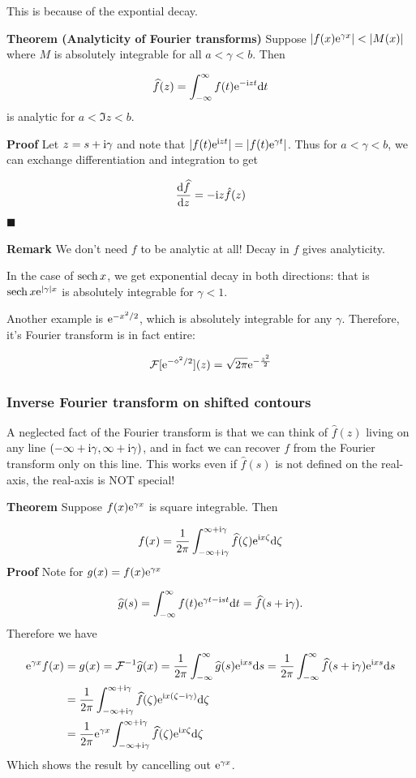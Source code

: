 \documentclass[12pt,a4paper]{article}
\def\D{ {\rm d} }
\def\I{ {\rm i} }
\def\E{ {\rm e} }
\def\FF{ {\cal F} }
\def\sech{ {\rm sech}\, }
\def\dt{\D t}
\def\dz{\D z}
\begin{document}
This is because of the expontial decay. 

\textbf{Theorem (Analyticity of Fourier transforms)} Suppose $|f(x) \E^{\gamma x}| < |M(x)|$  where $M$ is absolutely integrable for all $a < \gamma < b$. Then 

\[
\widehat f(z) = \int_{-\infty}^\infty f(t) \E^{-\I z t} \dt
\]
is analytic for $a < \Im z < b$.

\textbf{Proof} Let $z = s + \I \gamma$ and note that $|f(t) \E^{\I z t}| = |f(t) \E^{\gamma t}|$. Thus for $a < \gamma < b$, we can exchange differentiation and integration to get

\[
{\D \widehat f \over \dz} = -\I z \hat f(z)
\]
\ensuremath{\blacksquare}

\textbf{Remark} We don't need $f$ to be analytic at all!  Decay in $f$ gives analyticity.

In the case of $\sech x$, we get exponential decay in both directions:  that is $\sech x \E^{|\gamma| x}$ is absolutely integrable for $\gamma < 1$.

Another example is $\E^{-x^2/2}$, which is absolutely integrable for any $\gamma$. Therefore, it's Fourier transform is in fact entire:

\[
\FF[\E^{-\diamond^2/2}](z) = \sqrt{2\pi} \E^{-{z^2 \over 2}}
\]
\subsubsection{Inverse Fourier transform on shifted contours}
A neglected fact of the Fourier transform is that we can think of $\hat f(z)$  living on any line $(-\infty + \I \gamma, \infty+\I \gamma)$, and in fact we can recover $f$ from the  Fourier transform only on this line. This works even if $\hat f(s)$ is not defined on the real-axis,  the real-axis is NOT special!

\textbf{Theorem} Suppose $f(x) \E^{\gamma x}$ is square integrable. Then 

\[
f(x) = {1 \over 2 \pi} \int_{-\infty+\I \gamma}^{\infty + \I \gamma} \widehat f(\zeta) \E^{\I x \zeta} \D \zeta
\]
\textbf{Proof}  Note for $g(x) = f(x) \E^{\gamma x}$ 

\[
\widehat g(s) = \int_{-\infty}^\infty f(t) \E^{\gamma t - \I s t} \dt = \widehat f(s + \I \gamma).
\]
Therefore we have


\begin{align*}
\E^{\gamma x} f(x) &= g(x) = \FF^{-1} \widehat g(x) = {1 \over 2 \pi} \int_{-\infty}^{\infty} \widehat g(s) \E^{\I x s} \D s  ={1 \over 2 \pi} \int_{-\infty}^{\infty} \widehat f(s + \I \gamma) \E^{\I x s} \D s \\
   & = {1 \over 2 \pi} \int_{-\infty+ \I \gamma}^{\infty+ \I \gamma} \widehat f(\zeta) \E^{\I x (\zeta - \I \gamma)} \D \zeta \\
    &= {1 \over 2 \pi} 
   \E^{\gamma x}  \int_{-\infty+ \I \gamma}^{\infty+ \I \gamma} \widehat f(\zeta) \E^{\I x \zeta} \D \zeta
\end{align*}
Which shows the result by cancelling out $\E^{\gamma x}$.
\end{document}
